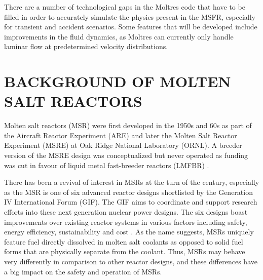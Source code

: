 \documentclass[letterpaper]{mandc2019}
\begin{document}
There are a number of technological gaps in the Moltres code that have to be filled in order to accurately simulate the physics present in the MSFR, especially for transient and accident scenarios. Some features that will be developed include improvements in the fluid dynamics, as Moltres can currently only handle laminar flow at predetermined velocity distributions.

\section{BACKGROUND OF MOLTEN SALT REACTORS}



Molten salt reactors (MSR) were first developed in the 1950s and 60s as part of the Aircraft Reactor Experiment (ARE) and later the Molten Salt Reactor Experiment (MSRE) at Oak Ridge National Laboratory (ORNL). A breeder version of the MSRE design was conceptualized but never operated as funding was cut in favour of liquid metal fast-breeder reactors (LMFBR) \cite{macpherson_molten_1985}.

There has been a revival of interest in MSRs at the turn of the century, especially as the MSR is one of six advanced reactor designs shortlisted by the Generation IV International Forum (GIF). The GIF aims to coordinate and support research efforts into these next generation nuclear power designs. The six designs boast improvements over existing reactor systems in various factors including safety, energy efficiency, sustainability and cost \cite{doe_technology_2002}. As the name suggests, MSRs uniquely feature fuel directly dissolved in molten salt coolants as opposed to solid fuel forms that are physically separate from the coolant. Thus, MSRs may behave very differently in comparison to other reactor designs, and these differences have a big impact on the safety and operation of MSRs.
\end{document}
